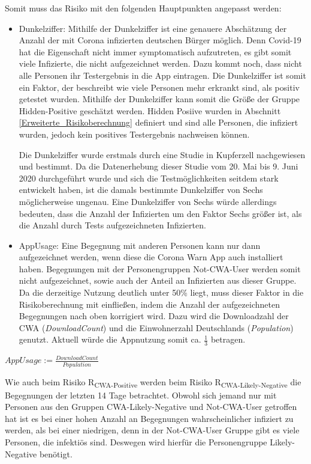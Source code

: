\documentclass[conference,compsoc]{IEEEtran}
\begin{document}
Somit muss das Risiko mit den folgenden Hauptpunkten angepasst werden:

\begin{itemize}
	\item Dunkelziffer: Mithilfe der Dunkelziffer ist eine genauere Abschätzung der Anzahl der mit Corona infizierten deutschen Bürger möglich. 
	Denn Covid-19 hat die Eigenschaft nicht immer symptomatisch aufzutreten, es gibt somit viele Infizierte, 
	die nicht aufgezeichnet werden. Dazu kommt noch, dass nicht alle Personen ihr Testergebnis in die App eintragen.
	Die Dunkelziffer ist somit  ein Faktor, der beschreibt wie viele Personen mehr erkrankt sind, 
	als positiv getestet wurden. Mithilfe der Dunkelziffer kann somit die Größe der Gruppe Hidden-Positive geschätzt werden.
	Hidden Posiive wurden in Abschnitt \ref{Erweiterte_Risikoberechnung} definiert und sind alle Personen, die infiziert wurden, jedoch kein positives Testergebnis nachweisen können. 

	Die Dunkelziffer wurde erstmals durch eine Studie in Kupferzell \cite{Dunkelziffer} nachgewiesen und bestimmt. 
	Da die Datenerhebung dieser Studie vom 20. Mai bis 9. Juni 2020 durchgeführt wurde und sich die Testmöglichkeiten seitdem stark entwickelt haben, 
	ist die damals bestimmte Dunkelziffer von Sechs möglicherweise ungenau. 
	Eine Dunkelziffer von Sechs würde allerdings bedeuten, dass die Anzahl der Infizierten um den Faktor Sechs größer ist, 
	als die Anzahl durch Tests aufgezeichneten Infizierten.
	\item  AppUsage: Eine Begegnung mit anderen Personen kann nur dann aufgezeichnet werden, wenn diese die Corona Warn App auch installiert haben. 
	Begegnungen mit der Personengruppen Not-CWA-User werden somit nicht aufgezeichnet, sowie auch der Anteil an Infizierten aus dieser Gruppe. 
	Da die derzeitige Nutzung deutlich unter 50\% liegt, muss dieser Faktor in die Risikoberechnung mit einfließen, 
	indem die Anzahl der aufgezeichneten Begegnungen nach oben korrigiert wird. 
	Dazu wird die Downloadzahl der CWA (\textit{DownloadCount}) \cite{Downloads} und die Einwohnerzahl Deutschlands (\textit{Population}) \cite{Einwohnerzahl} genutzt. 
	Aktuell würde die Appnutzung somit ca. $\frac{1}{3}$ betragen.
\end{itemize}

\centerline{\text{ }}
\centerline{$AppUsage := \frac{DownloadCount}{Population}$}
\centerline{\text{ }}

Wie auch beim Risiko R\textsubscript{CWA-Positive} werden beim Risiko R\textsubscript{CWA-Likely-Negative} die Begegnungen der letzten 14 Tage betrachtet.
Obwohl sich jemand nur mit Personen aus den Gruppen CWA-Likely-Negative und Not-CWA-User getroffen hat
ist es bei einer hohen Anzahl an Begegnungen wahrscheinlicher infiziert zu werden, als bei einer niedrigen, denn in der Not-CWA-User Gruppe gibt es viele Personen, die infektiös sind. 
Deswegen wird hierfür die Personengruppe Likely-Negative benötigt. 
\end{document}
